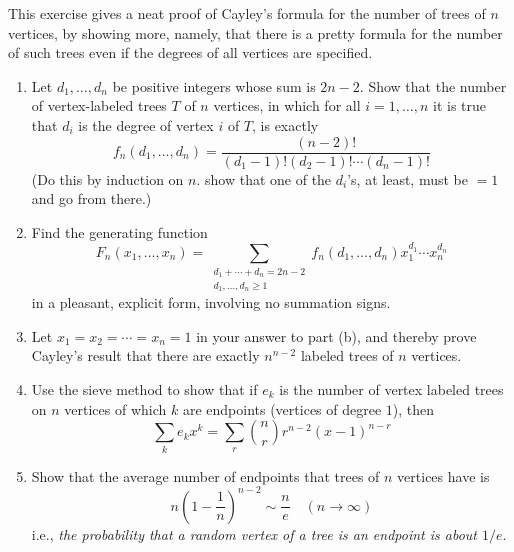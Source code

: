\begin{exercise}
    This exercise gives a neat proof of Cayley's formula for the number of trees of $n$ vertices, by showing more, namely, that there is a pretty formula for the number of such trees even if the degrees of all vertices are specified.
    \begin{enumerate}[label=(\alph*)]
        \item Let $d_1, \ldots, d_n$ be positive integers whose sum is $2n-2$. Show that the number of vertex-labeled trees $T$ of $n$ vertices, in which for all $i=1,\ldots,n$ it is true that $d_i$ is the degree of vertex $i$ of $T$, is exactly 
        \[
            f_n(d_1,\ldots,d_n)=\frac{(n-2)!}{(d_1-1)!(d_2-1)!\cdots (d_n-1)!}
        \]
        (Do this by induction on $n$. show that one of the $d_i$'s, at least, must be $=1$ and go from there.)
        \item Find the generating function 
        \[
            F_n(x_1,\ldots,x_n) = \sum_{\substack{d_1+\cdots+d_n = 2n-2 \\ d_1,\ldots,d_n\geq 1}} f_n(d_1, \ldots, d_n)x_1^{d_1}\cdots x_n^{d_n}
        \]
        in a pleasant, explicit form, involving no summation signs.
        \item Let $x_1=x_2=\cdots=x_n=1$ in your answer to part (b), and thereby prove Cayley's result that there are exactly $n^{n-2}$ labeled trees of $n$ vertices.
        \item Use the sieve method to show that if $e_k$ is the number of vertex labeled trees on $n$ vertices of which $k$ are endpoints (vertices of degree $1$), then 
        \[
            \sum_k e_k x^k = \sum_r \binom{n}{r}r^{n-2}(x-1)^{n-r}
        \]
        \item Show that the average number of endpoints that trees of $n$ vertices have is
        \[
            n\left(1-\frac{1}{n}\right)^{n-2} \sim \frac{n}{e} \quad (n\to\infty)
        \]
        i.e., \emph{the probability that a random vertex of a tree is an endpoint is about $1/e$}.
    \end{enumerate}
\end{exercise}
